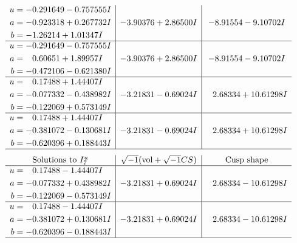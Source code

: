 \documentclass[1p]{elsarticle_modified}
\theoremstyle{definition}
\newcommand{\I}{\sqrt{-1}}
\begin{document}
$$\begin{array}{c|c|c}
\begin{aligned}
u &= -0.291649 - 0.757555 I \\
a &= -0.923318 + 0.267732 I \\
b &= -1.26214 + 1.01347 I\end{aligned}
 & -3.90376 + 2.86500 I & -8.91554 - 9.10702 I \\ \hline\begin{aligned}
u &= -0.291649 - 0.757555 I \\
a &= \phantom{-}0.60651 + 1.89957 I \\
b &= -0.472106 - 0.621380 I\end{aligned}
 & -3.90376 + 2.86500 I & -8.91554 - 9.10702 I \\ \hline\begin{aligned}
u &= \phantom{-}0.17488 + 1.44407 I \\
a &= -0.077332 - 0.438982 I \\
b &= -0.122069 + 0.573149 I\end{aligned}
 & -3.21831 - 0.69024 I & \phantom{-}2.68334 + 10.61298 I \\ \hline\begin{aligned}
u &= \phantom{-}0.17488 + 1.44407 I \\
a &= -0.381072 - 0.130681 I \\
b &= -0.620396 + 0.188443 I\end{aligned}
 & -3.21831 - 0.69024 I & \phantom{-}2.68334 + 10.61298 I\\
 \hline 
 \end{array}$$\newpage$$\begin{array}{c|c|c}  
\text{Solutions to }I^u_{7}& \I (\text{vol} + \sqrt{-1}CS) & \text{Cusp shape}\\
 \hline 
\begin{aligned}
u &= \phantom{-}0.17488 - 1.44407 I \\
a &= -0.077332 + 0.438982 I \\
b &= -0.122069 - 0.573149 I\end{aligned}
 & -3.21831 + 0.69024 I & \phantom{-}2.68334 - 10.61298 I \\ \hline\begin{aligned}
u &= \phantom{-}0.17488 - 1.44407 I \\
a &= -0.381072 + 0.130681 I \\
b &= -0.620396 - 0.188443 I\end{aligned}
 & -3.21831 + 0.69024 I & \phantom{-}2.68334 - 10.61298 I\\
 \hline 
 \end{array}$$\newpage\newpage\renewcommand{\arraystretch}{1}
\end{document}
